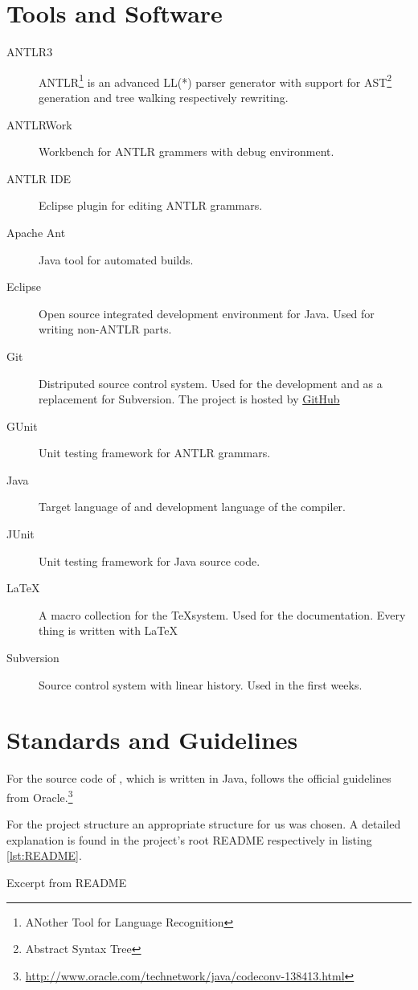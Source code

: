 \section{Tools and Software}
\begin{description}
	\item[ANTLR3] ANTLR\footnote{ANother Tool for Language Recognition} is an advanced LL(*) parser generator with support for AST\footnote{Abstract Syntax Tree} generation and tree walking respectively rewriting.
	\item[ANTLRWork] Workbench for ANTLR grammers with debug environment.
	\item[ANTLR IDE] Eclipse plugin for editing ANTLR grammars.
	\item[Apache Ant] Java tool for automated builds.
	\item[Eclipse] Open source integrated development environment for Java. Used for writing non-ANTLR parts.
	\item[Git] Distriputed source control system. Used for the development and as a replacement for Subversion. The project is hosted by \href{https://www.github.com/rubenbaer/ooplss}{GitHub}
	\item[GUnit] Unit testing framework for ANTLR grammars.
	\item[Java] Target language of \ooplss and development language of the compiler.
	\item[JUnit] Unit testing framework for Java source code.
	\item[\LaTeX] A macro collection for the \TeX system. Used for the documentation. Every thing is written with \LaTeX
	\item[Subversion] Source control system with linear history. Used in the first weeks.
\end{description}

\section{Standards and Guidelines}
For the source code of \ooplss, which is written in Java, follows the official
guidelines from Oracle.\footnote{\href{http://www.oracle.com/technetwork/java/codeconv-138413.html}{http://www.oracle.com/technetwork/java/codeconv-138413.html}}

For the project structure an appropriate structure for us was chosen.
A detailed explanation is found in the project's root README
respectively in listing \ref{lst:README}.

\begin{listing}
	\caption{Excerpt from README}
	\label{lst:README}
\end{listing}
